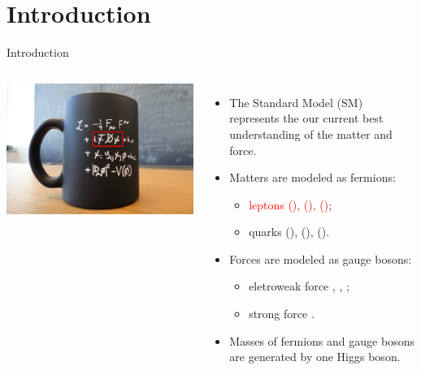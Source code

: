 \section{Introduction}

\begin{frame}{Introduction}
\smaller
    
    \begin{columns}
        \includegraphics[width=\textwidth]{slides/figures/cernmug.jpeg}
        \begin{itemize}
            \item The Standard Model (SM) represents the our current best understanding of the matter and force.
            \item Matters are modeled as fermions: 
            \begin{itemize}
            \smaller
                \item \textcolor{red}{leptons (\Pe\PGne), (\PGm\PGnGm), (\PGt\PGnGt)};
                \item quarks (\PQu\PQd), (\PQc\PQs), (\PQt\PQb).
            \end{itemize}
            \item Forces are modeled as gauge bosons:
            \begin{itemize}
            \smaller
                \item eletroweak force \PGg, \PZ, \textcolor{red}{\PW};
                \item strong force \Pg.
            \end{itemize}
            \item Masses of fermions and gauge bosons are generated by one Higgs boson.
        \end{itemize}
    \end{columns}
    

\end{frame}
